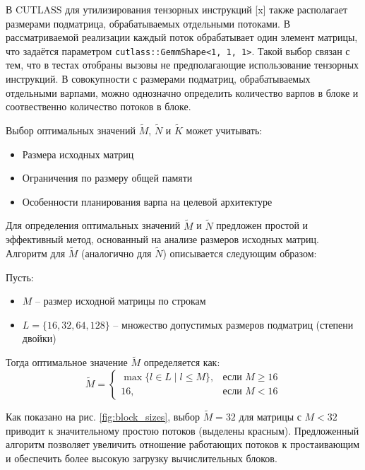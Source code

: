 В CUTLASS для утилизирования тензорных инструкций [x] также располагает размерами подматрица, обрабатываемых отдельными потоками.
В рассматриваемой реализации каждый поток обрабатывает один элемент матрицы, что задаётся параметром \texttt{cutlass::GemmShape<1, 1, 1>}.
Такой выбор связан с тем, что в тестах отобраны вызовы не предполагающие использование тензорных инструкций.
В совокупности с размерами подматриц, обрабатываемых отдельными варпами, можно однозначно определить количество варпов в блоке и соотвественно
количество потоков в блоке.

Выбор оптимальных значений $\tilde{M}$, $\tilde{N}$ и $\tilde{K}$ может учитывать:
\begin{itemize}
    \item Размера исходных матриц
    \item Ограничения по размеру общей памяти
    \item Особенности планирования варпа на целевой архитектуре
\end{itemize}

Для определения оптимальных значений $\tilde{M}$ и $\tilde{N}$ предложен простой и эффективный метод,
основанный на анализе размеров исходных матриц. Алгоритм для $\tilde{M}$ (аналогично для $\tilde{N}$) описывается следующим образом:

Пусть:
\begin{itemize}
    \item $M$ -- размер исходной матрицы по строкам
    \item $L = \{16, 32, 64, 128\}$ -- множество допустимых размеров подматриц (степени двойки)
\end{itemize}

Тогда оптимальное значение $\tilde{M}$ определяется как:
\begin{equation}
\tilde{M} =
\begin{cases}
\max \{ l \in L \mid l \leq M \}, & \text{если } M \geq 16 \\
16, & \text{если } M < 16
\end{cases}
\end{equation}

Как показано на рис. \ref{fig:block_sizes}, выбор $\tilde{M}=32$ для матрицы с $M<32$ приводит к значительному простою потоков (выделены красным).
Предложенный алгоритм позволяет увеличить отношение работающих потоков к простаивающим и обеспечить более высокую загрузку вычислительных блоков.

